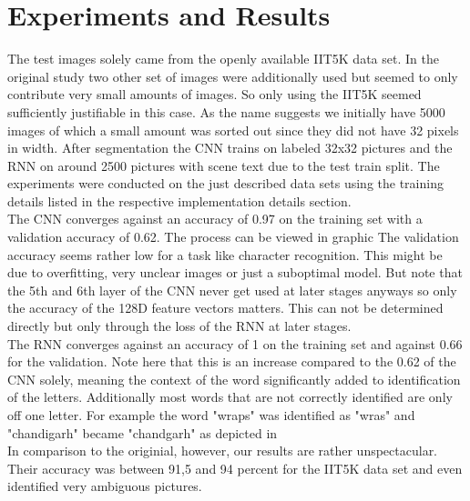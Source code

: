 \documentclass{utue} %
\begin{document}
\section{Experiments and Results}
The test images solely came from the openly available IIT5K data set. In the original study two other set of images were additionally used but seemed to only contribute very small amounts of images. So only using the IIT5K seemed sufficiently justifiable in this case. As the name suggests we initially have 5000 images of which a small amount was sorted out since they did not have 32 pixels in width. After segmentation the CNN trains on %
labeled 32x32 pictures and the RNN on around 2500 pictures with scene text due to the test train split. 
The experiments were conducted on the just described data sets using the training details listed in the respective implementation details section. \\
The CNN converges against an accuracy of 0.97 on the training set with a validation accuracy of 0.62. The process can be viewed in graphic %
The validation accuracy seems rather low for a task like character recognition. This might be due to overfitting, very unclear images or just a suboptimal model. But note that the 5th and 6th layer of the CNN never get used at later stages anyways so only the accuracy of the 128D feature vectors matters. This can not be determined directly but only through the loss of the RNN at later stages. \\
The RNN converges against an accuracy of 1 on the training set and against 0.66 for the validation. Note here that this is an increase compared to the 0.62 of the CNN solely, meaning the context of the word significantly added to identification of the letters. Additionally most words that are not correctly identified are only off one letter. For example the word "wraps" was identified as "wras" and "chandigarh" became "chandgarh" as depicted in %
\\
In comparison to the originial, however, our results are rather unspectacular. Their accuracy was between 91,5 and 94 percent for the IIT5K data set and even identified very ambiguous pictures.
\end{document}
